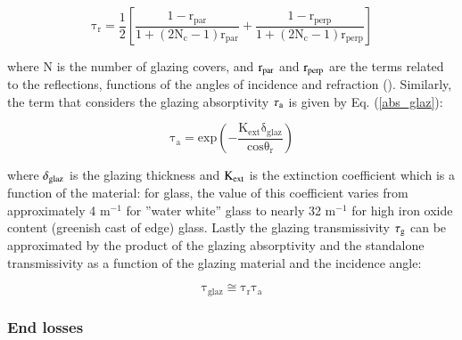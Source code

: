 \begin{equation}
	\mathrm{\tau_r = \frac{1}{2}\left[\frac{1 - r_{par}}{1 + (2N_c - 1)r_{par}} + \frac{1 - r_{perp}}{1 + (2N_c - 1)r_{perp}}\right]}
	\label{tau_r}
\end{equation}

\noindent where N is the number of glazing covers, and $\rm{r_{par}}$ and $\rm{r_{perp}}$ are the terms related to the reflections, functions of the angles of incidence and refraction (\cite{Duffie2013}). Similarly, the term that considers the glazing absorptivity $\rm{\tau_a}$ is given by Eq. (\ref{abs_glaz}):

\begin{equation}
	\mathrm{\tau_a = exp\left(-\frac{K_{ext}\delta_{glaz}}{cos\theta_r} \right) }
	\label{abs_glaz}
\end{equation}

\noindent where $\rm{\delta_{glaz}}$ is the glazing thickness and $\rm{K_{ext}}$ is the extinction coefficient which is a function of the material: for glass, the value of this coefficient varies from approximately 4 m$^{-1}$ for ''water white'' glass to nearly 32 m$^{-1}$ for high iron oxide content (greenish cast of edge) glass. Lastly the glazing transmissivity $\rm{\tau_g}$ can be approximated by the product of the glazing absorptivity and the standalone transmissivity as a function of the glazing material and the incidence angle:

\begin{equation}
	\mathrm{\tau_{glaz} \cong \tau_r\tau_a}
	\label{transmi}
\end{equation}



\subsubsection{End losses}

